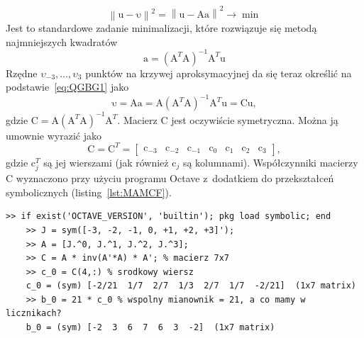 \documentclass[paper=a4,DIV=12]{tmmlab}
\newcommand{\brm}[1]{\bm{\mathrm{#1}}}
\begin{document}
\begin{appendices}
  \begin{equation}
    \left\lVert\brm{u} - \brm{\upsilon}\right\rVert^2
   =\left\lVert\brm{u} - \brm{A}\brm{a}\right\rVert^2 \rightarrow \min
    \label{eq:X57HW}
  \end{equation}
  Jest to standardowe zadanie minimalizacji, które rozwiązuje się metodą
  najmniejszych kwadratów
  \begin{equation}
    \brm{a} = \left(\brm{A}^T\brm{A}\right)^{-1}\brm{A}^T\brm{u}
    \label{eq:X4B7R}
  \end{equation}
  Rzędne $\upsilon_{-3},\dots,\upsilon_{3}$ punktów na krzywej aproksymacyjnej
  da się teraz określić na podstawie~\eqref{eq:QGBG1} jako
  \begin{equation}
    \brm{\upsilon} = \brm{A} \brm{a}
                   = \brm{A} \left(\brm{A}^T\brm{A}\right)^{-1}\brm{A}^T \brm{u}
                   = \brm{C} \brm{u},
    \label{eq:EJUDC}
  \end{equation}
  gdzie $\brm{C} = \brm{A}\left(\brm{A}^T\brm{A}\right)^{-1}\brm{A}^T$.
  Macierz $\brm{C}$ jest oczywiście symetryczna. Można ją umownie wyrazić jako
  \begin{equation}
    \brm{C} = \brm{C}^T = \begin{bmatrix}
      \brm{c}_{-3} &
      \brm{c}_{-2} &
      \brm{c}_{-1} &
      \brm{c}_{0} &
      \brm{c}_{1} &
      \brm{c}_{2} &
      \brm{c}_{3}
    \end{bmatrix},
    \label{eq:HHGJ9}
  \end{equation}
  gdzie $\brm{c}_j^T$ są jej wierszami (jak również $\brm{c}_j$ są kolumnami).
  Współczynniki macierzy $\brm{C}$ wyznaczono przy użyciu programu Octave
  z~dodatkiem do przekształceń symbolicznych (listing~\ref{lst:MAMCF}).
  \begin{lstfloat}
  \begin{lstlisting}[caption={Wyznaczanie współczynników macierzy $\brm{C}$ w~Octave},%
                     label={lst:MAMCF}]
    >> if exist('OCTAVE_VERSION', 'builtin'); pkg load symbolic; end
    >> J = sym([-3, -2, -1, 0, +1, +2, +3]');
    >> A = [J.^0, J.^1, J.^2, J.^3];
    >> C = A * inv(A'*A) * A'; % macierz 7x7
    >> c_0 = C(4,:) % srodkowy wiersz
    c_0 = (sym) [-2/21  1/7  2/7  1/3  2/7  1/7  -2/21]  (1x7 matrix)
    >> b_0 = 21 * c_0 % wspolny mianownik = 21, a co mamy w licznikach?
    b_0 = (sym) [-2  3  6  7  6  3  -2]  (1x7 matrix)
  \end{lstlisting}
  \end{lstfloat}


\end{appendices}
\end{document}
